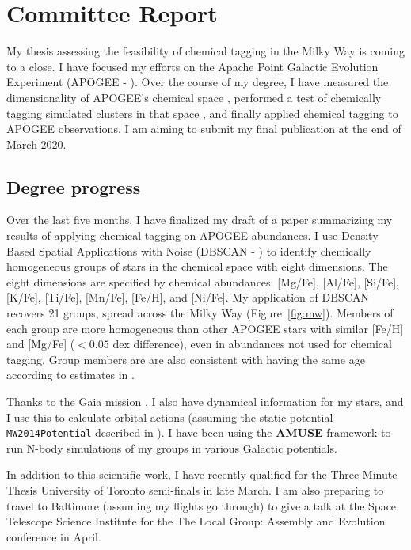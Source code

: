 \documentclass[11pt]{article}
\begin{document}
    
    \section*{Committee Report}


	My thesis assessing the feasibility of chemical tagging in the Milky Way is coming to a close. I have focused my efforts on the Apache Point Galactic Evolution Experiment (APOGEE - \citealt{Majewski2017}). Over the course of my degree, I have measured the dimensionality of APOGEE's chemical space \citep{Price-Jones2018}, performed a test of chemically tagging simulated clusters in that space \citep{Price-Jones2019}, and finally applied chemical tagging to APOGEE observations. I am aiming to submit my final publication at the end of March 2020.

    \subsection*{Degree progress}
  
    Over the last five months, I have finalized my draft of a paper summarizing my results of applying chemical tagging on APOGEE abundances. I use Density Based Spatial Applications with Noise (DBSCAN - \citealt{Ester1996}) to identify chemically homogeneous groups of stars in the chemical space with eight dimensions. The eight dimensions are specified by chemical abundances: [Mg/Fe], [Al/Fe], [Si/Fe], [K/Fe], [Ti/Fe], [Mn/Fe], [Fe/H], and [Ni/Fe]. My application of DBSCAN recovers 21 groups, spread across the Milky Way (Figure~\ref{fig:mw}). Members of each group are more homogeneous than other APOGEE stars with similar [Fe/H] and [Mg/Fe] ($< 0.05$ dex difference), even in abundances not used for chemical tagging. Group members are are also consistent with having the same age according to estimates in \citet{Mackereth2019}. 
    
    Thanks to the Gaia mission \citep{GaiaCollaboration2016, GaiaCollaboration2018}, I also have dynamical information for my stars, and I use this to calculate orbital actions (assuming the static potential \texttt{MW2014Potential} described in \citealt{Bovy2015}). I have been using the \textbf{AMUSE} framework to run N-body simulations of my groups in various Galactic potentials.

	In addition to this scientific work, I have recently qualified for the Three Minute Thesis University of Toronto semi-finals in late March. I am also preparing to travel to Baltimore (assuming my flights go through) to give a talk at the Space Telescope Science Institute for the The Local Group: Assembly and Evolution conference in April. 
	
\end{document}
